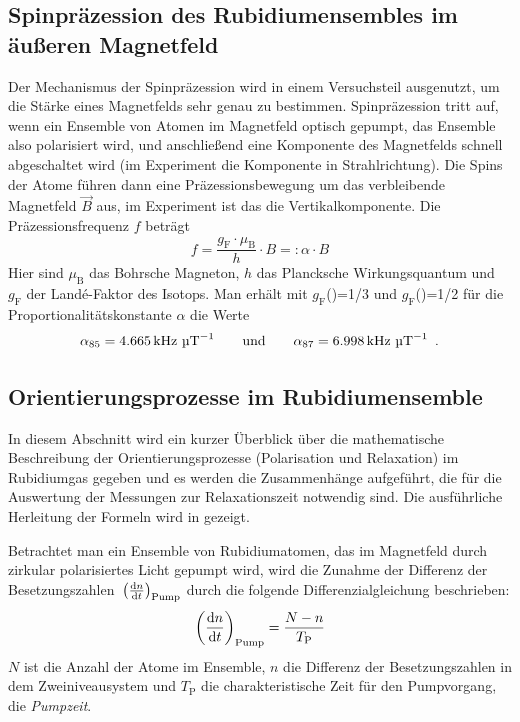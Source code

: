 \subsection{Spinpräzession des Rubidiumensembles im äußeren Magnetfeld}
Der Mechanismus der Spinpräzession wird in einem Versuchsteil ausgenutzt,
um die Stärke eines Magnetfelds sehr genau zu bestimmen.
Spinpräzession tritt auf, wenn ein Ensemble von Atomen im Magnetfeld optisch gepumpt,
das Ensemble also polarisiert wird, und anschließend eine Komponente
des Magnetfelds schnell abgeschaltet wird (im Experiment die Komponente in Strahlrichtung).
Die Spins der Atome führen dann eine Präzessionsbewegung um das verbleibende Magnetfeld $\vec{B}$ aus,
im Experiment ist das die Vertikalkomponente.  %
Die Präzessionsfrequenz $f$ beträgt \cite{staatsex}
\begin{equation}
    \label{eq:gr:spinpräz}
    f=\frac{g_\text{F} \cdot \mu_\text{B}}{h} \cdot B=: \alpha \cdot B
\end{equation}
Hier sind $\mu_\text{B}$ das Bohrsche Magneton, $h$ das Plancksche Wirkungsquantum und
$g_\text{F}$ der Landé-Faktor des Isotops.
Man erhält mit $g_\text{F}$()=1/3 und $g_\text{F}$()=1/2 \cite{staatsex} für
die Proportionalitätskonstante $\alpha$ die Werte
\begin{equation}
    \label{eq:gr:alpha}
    \alpha_{85}=4.665\,\text{kHz } \text{\textmu T}^{-1} \qquad \text{und} \qquad	\alpha_{87}=6.998\,\text{kHz } \text{\textmu T}^{-1} \ \, .
\end{equation}

\subsection{Orientierungsprozesse im Rubidiumensemble}
In diesem Abschnitt wird ein kurzer Überblick über die mathematische Beschreibung der Orientierungsprozesse
(Polarisation und Relaxation) im Rubidiumgas gegeben und es werden die Zusammenhänge aufgeführt, die für die
Auswertung der Messungen zur Relaxationszeit notwendig sind.
Die ausführliche Herleitung der Formeln wird in \cite{staatsex} gezeigt.

Betrachtet man ein Ensemble von Rubidiumatomen, das im Magnetfeld durch zirkular polarisiertes Licht gepumpt wird,
wird die Zunahme der Differenz der Besetzungszahlen~$\left(\frac{\mathrm{d} n}{\mathrm{d} t}\right)_{\text{Pump}}$
durch die folgende Differenzialgleichung beschrieben:
\begin{equation}
    \left(\frac{\mathrm{d} n}{\mathrm{d} t}\right)_{\text{Pump}}=\frac{N-n}{T_\text{P}}
\end{equation}
$N$ ist die Anzahl der Atome im Ensemble, $n$ die Differenz der Besetzungszahlen in dem Zweiniveausystem
und $T_\text{P}$ die charakteristische Zeit für den Pumpvorgang, die \emph{Pumpzeit}.

